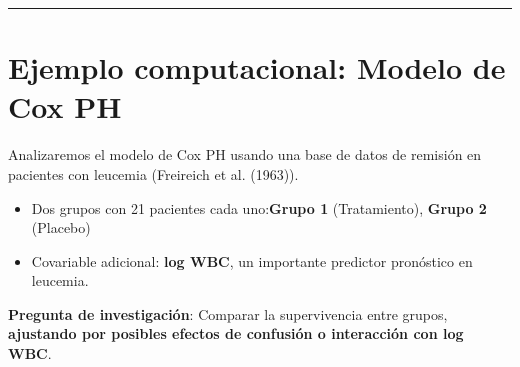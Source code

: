 \documentclass[
]{article}
\providecommand{\tightlist}{%
  \setlength{\itemsep}{0pt}\setlength{\parskip}{0pt}}
\begin{document}
\begin{center}\rule{0.5\linewidth}{0.5pt}\end{center}

\section{Ejemplo computacional: Modelo de Cox
PH}\label{ejemplo-computacional-modelo-de-cox-ph}

Analizaremos el modelo de Cox PH usando una base de datos de remisión en
pacientes con leucemia (Freireich et al. (1963)).

\begin{itemize}
\tightlist
\item
  Dos grupos con 21 pacientes cada uno:\textbf{Grupo 1} (Tratamiento),
  \textbf{Grupo 2} (Placebo)
\item
  Covariable adicional: \textbf{log WBC}, un importante predictor
  pronóstico en leucemia.
\end{itemize}

\textbf{Pregunta de investigación}: Comparar la supervivencia entre
grupos, \textbf{ajustando por posibles efectos de confusión o
interacción con log WBC}.
\end{document}
